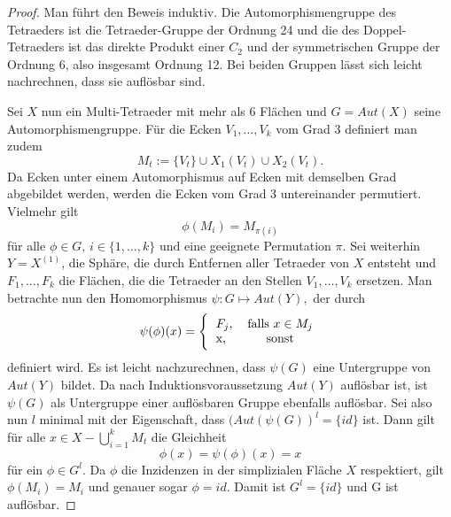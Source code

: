 \documentclass[12pt,titlepage,twoside,cleardoublepage]{article}
\theoremstyle{nummermitklammern}
\numberwithin{equation}{section}
\begin{document}
\begin{proof}
Man führt den Beweis induktiv. Die Automorphismengruppe des Tetraeders ist die Tetraeder-Gruppe der Ordnung 24 und die des Doppel-Tetraeders ist das direkte Produkt einer $C_2$ und der symmetrischen Gruppe der Ordnung 6, also insgesamt Ordnung 12. Bei beiden Gruppen lässt sich leicht nachrechnen, dass sie auflösbar sind.

Sei $X$ nun ein Multi-Tetraeder mit mehr als  6 Flächen und $G=Aut(X)$ seine Automorphismengruppe. Für die Ecken $V_1,\ldots,V_k$ vom Grad $3$ definiert man zudem 
\[
M_t:=\{V_t\} \cup X_1(V_t) \cup X_2(V_t).  
\] 
Da Ecken unter einem Automorphismus auf Ecken mit demselben Grad abgebildet werden, werden die Ecken vom Grad 3 untereinander permutiert. Vielmehr gilt 
\[
\phi(M_i)=M_{\pi(i)} 
\]
für alle $\phi \in G,\,i\in \{1,\ldots,k\}$ und eine geeignete Permutation $\pi.$ Sei weiterhin $Y=X^{(1)}$, die Sphäre, die durch Entfernen aller Tetraeder von $X$ entsteht und $F_1,\ldots,F_k$ die Flächen, die die Tetraeder an den Stellen $V_1,\ldots,V_k$ ersetzen. Man betrachte nun den Homomorphismus $\psi:G\mapsto Aut(Y),$ der durch  
\[
\psi(\phi)(x)=\Biggl\{
\begin{tabular}[l]{lcr}
$F_j$,&\textcolor{black}{ falls  $x\in M_j$} \\
x,& sonst\\
\end{tabular}
\]
definiert wird. Es ist leicht nachzurechnen, dass $\psi(G)$ eine Untergruppe von $Aut(Y)$ bildet. Da nach Induktionsvoraussetzung $Aut(Y)$ auflösbar ist, ist $\psi(G)$ als Untergruppe einer auflösbaren Gruppe ebenfalls auflösbar. 
Sei also nun $l$ minimal mit der Eigenschaft, dass $(Aut(\psi(G))^l=\{id\}$ ist. Dann gilt für alle $x\in X-\bigcup_{i=1}^k M_t$ die Gleichheit 
\[
\phi(x)=\psi(\phi)(x)=x
\] für ein $\phi \in G^l$. Da $\phi$ die Inzidenzen in der simplizialen Fläche $X$ respektiert, gilt $\phi(M_i)=M_i$ und genauer sogar $\phi=id.$ Damit ist $G^l =\{id\}$ und G ist auflösbar.
  
\end{proof}
\end{document}

